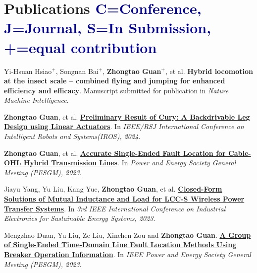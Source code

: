\documentclass[a4paper,11pt]{article}
\begin{document}
\section{\textbf{Publications} \hspace*{\fill} \textcolor{darkblue}{\scriptsize C=Conference, J=Journal, S=In Submission, +=equal contribution}}
\vspace{0.2mm}
\small{
\begin{enumerate}[leftmargin=*, labelsep=0.5em, align=left, widest={[\textbf{S.1}]}, itemindent=0em, label={\textbf{[\arabic*]}]}]

\item[\textbf{[S.1]}] Yi-Hsuan Hsiao$^+$, Songnan Bai$^+$, \textbf{Zhongtao Guan$^+$}, et al. \textbf{Hybrid locomotion at the insect scale – combined flying and jumping for enhanced efficiency and efficacy}. Manuscript submitted for publication in \textit{ Nature Machine Intelligence}.\label{S.1}

\item[\textbf{[C.1]}] \textbf{Zhongtao Guan}, et al. \href{https://github.com/horychen/CuryLegWebotSimulation}{\textbf{Preliminary Result of Cury: A Backdrivable Leg Design using Linear Actuators}}. In \textit{IEEE/RSJ International Conference on Intelligent Robots and Systems(IROS), 2024}. \label{C.1}

\item[\textbf{[C.2]}] \textbf{Zhongtao Guan}, et al. \href{https://ieeexplore.ieee.org/abstract/document/10253208}{\textbf{Accurate Single-Ended Fault Location for Cable-OHL Hybrid Transmission Lines}}. In \textit{Power and Energy Society General Meeting (PESGM), 2023}. \label{C.2}

\item[\textbf{[C.3]}] Jiayu Yang, Yu Liu, Kang Yue, \textbf{Zhongtao Guan}, et al. \href{https://ieeexplore.ieee.org/abstract/document/10253748}{\textbf{Closed-Form Solutions of Mutual Inductance and Load for LCC-S Wireless Power Transfer Systems}}. In \textit{3rd IEEE International Conference on Industrial Electronics for Sustainable Energy Systems, 2023}. \label{C.3}

\item[\textbf{[C.4]}] Mengzhao Duan, Yu Liu, Ze Liu, Xinchen Zou and \textbf{Zhongtao Guan}. \href{https://ieeexplore.ieee.org/abstract/document/10252886}{\textbf{A Group of Single-Ended Time-Domain Line Fault Location Methods Using Breaker Operation Information}}. In \textit{IEEE Power and Energy Society General Meeting (PESGM), 2023}.\label{C.4}
\end{enumerate}
}
\end{document}
